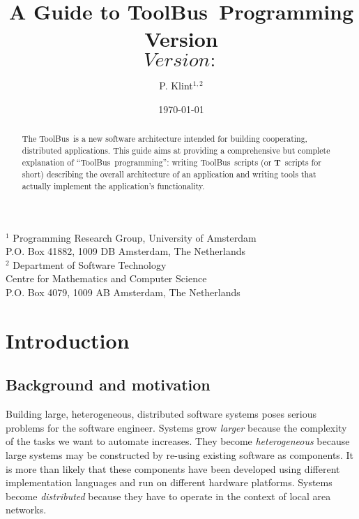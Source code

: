 \documentclass[twoside]{article} %
\begin{document}
\newcommand{\TB}{{\sc ToolBus}}
\newcommand{\T}{{\bf T}}
\newcommand{\spec}[1]{{\rm #1}}
\newcommand{\script}[1]{{\tt #1}}
\newcommand{\ASFSDF}{{\sc Asf+Sdf}}
\newcommand{\ASF}{{\sc Asf}}
\newcommand{\SDF}{{\sc Sdf}}
\newcommand{\GEL}{{\sc Gel}}
\newcommand{\iter}{\,^*\,}
\newcommand{\emp}[1]{{\em #1}}
\newcommand{\txttt}[1]{{\tt #1}}

%

\title{A Guide to \TB\ Programming\\
Version $$Version: $$}
\author{P. Klint$^{1,2}$}
\date{\today}
\maketitle
\begin{center}
       {\footnotesize $^1$ Programming Research Group, University of Amsterdam\\
        P.O. Box 41882, 1009 DB Amsterdam, The Netherlands\\
        $^2$ Department of Software Technology\\
        Centre for Mathematics and Computer Science\\
        P.O. Box 4079, 1009 AB Amsterdam, The Netherlands}
\end{center}

\begin{abstract}
The \TB\ is a new software architecture intended for building
cooperating, distributed applications.  This guide aims at providing a
comprehensive but complete explanation of ``\TB\ programming'':
writing \TB{}ripts (or \T\ scripts for short) describing the overall architecture of an
application and writing tools that actually implement the application's
functionality.

\end{abstract}
\tableofcontents

\newpage

\section{Introduction}

\subsection{Background and motivation}
Building large, heterogeneous, distributed software systems poses
serious problems for the software engineer.  Systems grow {\em larger}
because the complexity of the tasks we want to automate
increases.  They become {\em heterogeneous} because large systems may be
constructed by re-using existing software as components.
It is more than likely that these components have been developed
using different implementation languages and run on different
hardware platforms.
Systems become {\em distributed} because they have to operate
in the context of local area networks.
\end{document}
